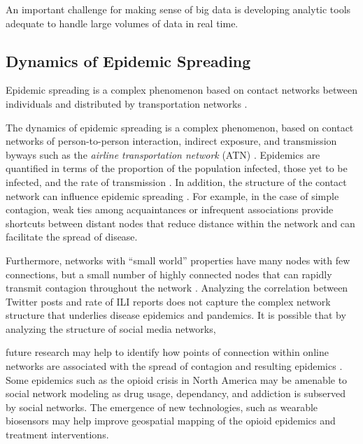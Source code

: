 \documentclass[sigconf]{acmart}
\begin{document}
An important challenge for making sense of big data is developing analytic 
tools adequate to handle large volumes of data in real time.

\subsection{Dynamics of Epidemic Spreading}

Epidemic spreading is a complex phenomenon based on contact networks between 
individuals and distributed by transportation networks \cite{Colizza06}.

The dynamics of epidemic spreading is a complex phenomenon, based on contact 
networks of person-to-person interaction, indirect exposure, and transmission 
byways such as the {\it airline transportation network} (ATN) \cite{Colizza06}. 
Epidemics are quantified in terms of the proportion of the population infected, 
those yet to be infected, and the rate of transmission \cite{hethcote00}. In 
addition, the structure of the contact network can influence epidemic spreading 
\cite{pastor01}. For example, in the case of simple contagion, weak ties among 
acquaintances or infrequent associations provide shortcuts between distant nodes 
that reduce distance within the network \cite{granovetter73} and can facilitate 
the spread of disease. 

Furthermore, networks with ``small world'' properties have many nodes with 
few connections, but a small number of highly connected nodes that can rapidly 
transmit contagion throughout the network \cite{watts98}. Analyzing the 
correlation between Twitter posts and rate of ILI reports does not capture the 
complex network structure that underlies disease epidemics and pandemics. 
It is possible that by analyzing the structure of social media networks, 

future research may help to identify how points of connection within online
networks are associated with the spread of contagion and resulting epidemics 
\cite{zhu17}. Some epidemics such as the opioid crisis in North America 
\cite{volkow14} may be amenable to social network modeling as drug usage, 
dependancy, and addiction is subserved by social networks. The emergence of 
new technologies, such as wearable biosensors \cite{carreiro15} may help 
improve geospatial mapping of the opioid epidemics and treatment interventions.

\end{document}

